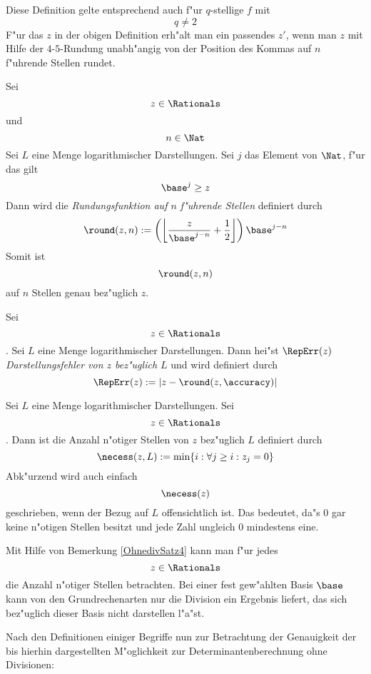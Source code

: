     Diese Definition gelte entsprechend auch f"ur $q$-stellige $f$ mit
    \[ q \neq 2 \] 
\MyEndDef
F"ur das $z$ in der obigen Definition erh"alt man ein passendes $z'$, wenn
man $z$ mit Hilfe der $4$-$5$-Rundung unabh"angig von der Position 
des Kommas auf $n$ f"uhrende Stellen rundet. 

\MyBeginDef
    Sei \[ z \in \Rationals \] und \[ n \in \Nat \]
    Sei $L$ eine Menge logarithmischer Darstellungen. Sei $j$ das Element 
    von $\Nat$, f"ur das gilt \[ \base^j \geq z \]
    Dann wird die {\em Rundungsfunktion auf $n$ f"uhrende Stellen} definiert
    durch 
    \[ \round(z,n):= 
           \left(
           \left\lfloor
               \frac{ z }{ \base^{j-n} } + \frac{1}{2}
           \right\rfloor
           \right) \base^{j-n}
    \]
\MyEndDef
Somit ist \[ \round(z,n) \] auf $n$ Stellen genau bez"uglich $z$.

\MyBeginDef
    Sei \[ z \in \Rationals \].
    Sei $L$ eine Menge logarithmischer Darstellungen.
    Dann hei"st $\RepErr(z)$ {\em Darstellungsfehler von $z$ bez"uglich
    $L$} und wird definiert durch \[ \RepErr(z):= |z-\round(z,\accuracy)| \]
\MyEndDef

\MyBeginDef
    Sei $L$ eine Menge logarithmischer Darstellungen.
    Sei \[ z \in \Rationals \].
    Dann ist die  {Anzahl n"otiger Stellen von $z$ bez"uglich $L$}
    definiert durch
    \[ \necess(z,L):= \min\{i: \forall j \geq i: z_j=0\} \]
    Abk"urzend wird auch einfach \[ \necess(z) \] geschrieben, wenn der
    Bezug auf $L$ offensichtlich ist.
\MyEndDef
Das bedeutet, da"s $0$ gar keine n"otigen Stellen besitzt und jede Zahl
ungleich $0$ mindestens eine.

Mit Hilfe von Bemerkung \ref{OhnedivSatz4}
kann man f"ur jedes \[ z \in \Rationals \] die Anzahl n"otiger
Stellen betrachten. Bei einer fest gew"ahlten Basis $\base$ kann von
den Grundrechenarten nur die Division ein Ergebnis liefert, das sich
bez"uglich dieser Basis nicht darstellen l"a"st.

Nach den Definitionen einiger Begriffe nun zur Betrachtung der Genauigkeit
der bis hierhin dargestellten M"oglichkeit zur Determinantenberechnung ohne
Divisionen:

